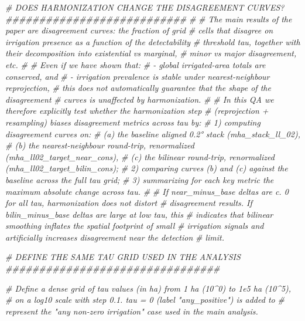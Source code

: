 \documentclass[
  11pt,
]{article}
\newenvironment{Shaded}{\begin{snugshade}}{\end{snugshade}}
\newcommand{\CommentTok}[1]{\textcolor[rgb]{0.56,0.35,0.01}{\textit{#1}}}
\begin{document}
\begin{Shaded}
\begin{Highlighting}[]
\CommentTok{\# DOES HARMONIZATION CHANGE THE DISAGREEMENT CURVES? \#\#\#\#\#\#\#\#\#\#\#\#\#\#\#\#\#\#\#\#\#\#\#\#\#\#\#}
\CommentTok{\#}
\CommentTok{\# The main results of the paper are disagreement curves: the fraction of grid}
\CommentTok{\# cells that disagree on irrigation presence as a function of the detectability}
\CommentTok{\# threshold tau, together with their decomposition into existential vs marginal,}
\CommentTok{\# minor vs major disagreement, etc.}
\CommentTok{\#}
\CommentTok{\# Even if we have shown that:}
\CommentTok{\#   {-} global irrigated{-}area totals are conserved, and}
\CommentTok{\#   {-} irrigation prevalence is stable under nearest{-}neighbour reprojection,}
\CommentTok{\# this does not automatically guarantee that the shape of the disagreement}
\CommentTok{\# curves is unaffected by harmonization.}
\CommentTok{\#}
\CommentTok{\# In this QA we therefore explicitly test whether the harmonization step}
\CommentTok{\# (reprojection + resampling) biases disagreement metrics across tau by:}
\CommentTok{\#   1) computing disagreement curves on:}
\CommentTok{\#        (a) the baseline aligned 0.2° stack (mha\_stack\_ll\_02),}
\CommentTok{\#       (b) the nearest{-}neighbour round{-}trip, renormalized (mha\_ll02\_target\_near\_cons),}
\CommentTok{\#      (c) the bilinear round{-}trip, renormalized (mha\_ll02\_target\_bilin\_cons);}
\CommentTok{\#   2) comparing curves (b) and (c) against the baseline across the full tau grid;}
\CommentTok{\#   3) summarizing for each key metric the maximum absolute change across tau.}
\CommentTok{\#}
\CommentTok{\# If near\_minus\_base deltas are c. 0 for all tau, harmonization does not distort}
\CommentTok{\# disagreement results. If bilin\_minus\_base deltas are large at low tau, this}
\CommentTok{\# indicates that bilinear smoothing inflates the spatial footprint of small}
\CommentTok{\# irrigation signals and artificially increases disagreement near the detection}
\CommentTok{\# limit.}

\CommentTok{\# DEFINE THE SAME TAU GRID USED IN THE ANALYSIS \#\#\#\#\#\#\#\#\#\#\#\#\#\#\#\#\#\#\#\#\#\#\#\#\#\#\#\#\#\#\#\#}

\CommentTok{\# Define a dense grid of tau values (in ha) from 1 ha (10\^{}0) to 1e5 ha (10\^{}5),}
\CommentTok{\# on a log10 scale with step 0.1. tau = 0 (label "any\_positive") is added to}
\CommentTok{\# represent the "any non{-}zero irrigation" case used in the main analysis.}


\end{Highlighting}
\end{Shaded}
\end{document}
